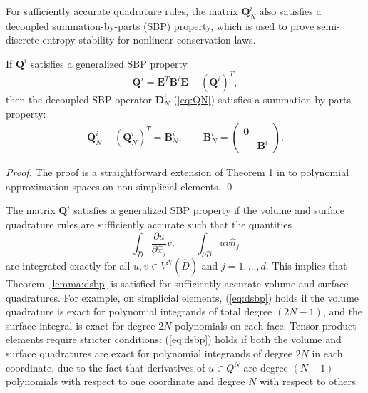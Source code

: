 \documentclass{svjour3}                     %
\renewcommand{\hat}{\widehat}
\newcommand{\pd}[2]{\frac{\partial#1}{\partial#2}}
\newcommand{\LRp}[1]{\left( #1 \right)}
\begin{document}
For sufficiently accurate quadrature rules, the matrix $\bm{Q}^i_N$ also satisfies a decoupled summation-by-parts (SBP) property, which is used to prove semi-discrete entropy stability for nonlinear conservation laws.  
\begin{theorem}%
If $\bm{Q}^i$ satisfies a generalized SBP property
\[
\bm{Q}^i = \bm{E}^T\bm{B}^i\bm{E} - \LRp{\bm{Q}^i}^T,
\]
then the decoupled SBP operator $\bm{D}^i_N$ (\ref{eq:QN}) satisfies a summation by parts property:
\begin{gather}
\bm{Q}^i_N+\LRp{\bm{Q}^i_N}^T = \bm{B}^i_N, \qquad \bm{B}^i_N = \LRp{\begin{array}{cc}\bm{0}&\\ & \bm{B}^i\end{array}}.\label{eq:dsbp}
\end{gather}
\label{lemma:dsbp}
\end{theorem}
\begin{proof}
The proof is a straightforward extension of Theorem 1 in \cite{chan2017discretely} to polynomial approximation spaces on non-simplicial elements.  
\qed\end{proof}

The matrix $\bm{Q}^i$ satisfies a generalized SBP property if the volume and surface quadrature rules are sufficiently accurate such that the quantities
\[
\int_{\hat{D}} \pd{u}{\hat{x}_j} v, \qquad \int_{\partial \hat{D}} u v \hat{n}_j
\]
are integrated exactly for all $u,v \in V^N\LRp{\hat{D}}$ and $j = 1,\ldots, d$.  This implies that Theorem~\ref{lemma:dsbp} is satisfied for sufficiently accurate volume and surface quadratures.  For example, on simplicial elements, (\ref{eq:dsbp}) holds if the volume quadrature is exact for polynomial integrands of total degree $(2N-1)$, and the surface integral is exact for degree $2N$ polynomials on each face.  Tensor product elements require stricter conditions: (\ref{eq:dsbp}) holds if both the volume and surface quadratures are exact for polynomial integrands of degree $2N$ in each coordinate, due to the fact that derivatives of $u\in Q^N$ are degree $(N-1)$ polynomials with respect to one coordinate and degree $N$ with respect to others.  
\end{document}

